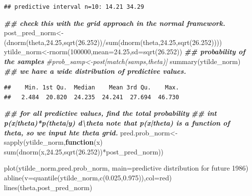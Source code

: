 \documentclass[
]{book}
\newenvironment{Shaded}{\begin{snugshade}}{\end{snugshade}}
\newcommand{\AttributeTok}[1]{\textcolor[rgb]{0.77,0.63,0.00}{#1}}
\newcommand{\CommentTok}[1]{\textcolor[rgb]{0.56,0.35,0.01}{\textit{#1}}}
\newcommand{\ControlFlowTok}[1]{\textcolor[rgb]{0.13,0.29,0.53}{\textbf{#1}}}
\newcommand{\DecValTok}[1]{\textcolor[rgb]{0.00,0.00,0.81}{#1}}
\newcommand{\DocumentationTok}[1]{\textcolor[rgb]{0.56,0.35,0.01}{\textbf{\textit{#1}}}}
\newcommand{\FloatTok}[1]{\textcolor[rgb]{0.00,0.00,0.81}{#1}}
\newcommand{\FunctionTok}[1]{\textcolor[rgb]{0.00,0.00,0.00}{#1}}
\newcommand{\NormalTok}[1]{#1}
\newcommand{\OtherTok}[1]{\textcolor[rgb]{0.56,0.35,0.01}{#1}}
\newcommand{\SpecialCharTok}[1]{\textcolor[rgb]{0.00,0.00,0.00}{#1}}
\newcommand{\StringTok}[1]{\textcolor[rgb]{0.31,0.60,0.02}{#1}}
\theoremstyle{definition}
\theoremstyle{definition}
\theoremstyle{definition}
\theoremstyle{definition}
\theoremstyle{remark}
\begin{document}
\begin{verbatim}
## predictive interval n=10: 14.21 34.29
\end{verbatim}

\begin{Shaded}
\begin{Highlighting}[]
   \DocumentationTok{\#\# check this with the grid approach in the normal framework.  }
\NormalTok{  post\_pred\_norm}\OtherTok{\textless{}{-}}\NormalTok{(}\FunctionTok{dnorm}\NormalTok{(theta,}\FloatTok{24.25}\NormalTok{,}\FunctionTok{sqrt}\NormalTok{(}\FloatTok{26.252}\NormalTok{))}\SpecialCharTok{/}\FunctionTok{sum}\NormalTok{(}\FunctionTok{dnorm}\NormalTok{(theta,}\FloatTok{24.25}\NormalTok{,}\FunctionTok{sqrt}\NormalTok{(}\FloatTok{26.252}\NormalTok{))))}
\NormalTok{   ytilde\_norm}\OtherTok{\textless{}{-}}\FunctionTok{rnorm}\NormalTok{(}\DecValTok{100000}\NormalTok{,}\AttributeTok{mean=}\FloatTok{24.25}\NormalTok{,}\AttributeTok{sd=}\FunctionTok{sqrt}\NormalTok{(}\FloatTok{26.252}\NormalTok{)) }
 \DocumentationTok{\#\# probability of the samples }
 \CommentTok{\#prob\_samp\textless{}{-}post[match(samps,theta)]}
  \FunctionTok{summary}\NormalTok{(ytilde\_norm) }\DocumentationTok{\#\# we have a wide distribution of predictive values.}
\end{Highlighting}
\end{Shaded}

\begin{verbatim}
##    Min. 1st Qu.  Median    Mean 3rd Qu.    Max. 
##   2.484  20.820  24.235  24.241  27.694  46.730
\end{verbatim}

\begin{Shaded}
\begin{Highlighting}[]
\DocumentationTok{\#\# for all predictive values,  find the total probability  }
   \DocumentationTok{\#\# int p(x|theta)*p(theta|y) d\textbackslash{}theta  note that p(x|theta) is a function of theta, so we input hte theta grid.}
\NormalTok{ pred.prob\_norm}\OtherTok{\textless{}{-}}\FunctionTok{sapply}\NormalTok{(ytilde\_norm,}\ControlFlowTok{function}\NormalTok{(x) }\FunctionTok{sum}\NormalTok{(}\FunctionTok{dnorm}\NormalTok{(x,}\FloatTok{24.25}\NormalTok{,}\FunctionTok{sqrt}\NormalTok{(}\FloatTok{26.252}\NormalTok{))}\SpecialCharTok{*}\NormalTok{post\_pred\_norm))  }
  
 \FunctionTok{plot}\NormalTok{(ytilde\_norm,pred.prob\_norm, }\AttributeTok{main=}\StringTok{\textquotesingle{}predictive distribution for future 1986\textquotesingle{}}\NormalTok{)}
 \FunctionTok{abline}\NormalTok{(}\AttributeTok{v=}\FunctionTok{quantile}\NormalTok{(ytilde\_norm,}\FunctionTok{c}\NormalTok{(}\FloatTok{0.025}\NormalTok{,}\FloatTok{0.975}\NormalTok{)),}\AttributeTok{col=}\StringTok{\textquotesingle{}red\textquotesingle{}}\NormalTok{)}
 \FunctionTok{lines}\NormalTok{(theta,post\_pred\_norm)}
\end{Highlighting}
\end{Shaded}
\end{document}

